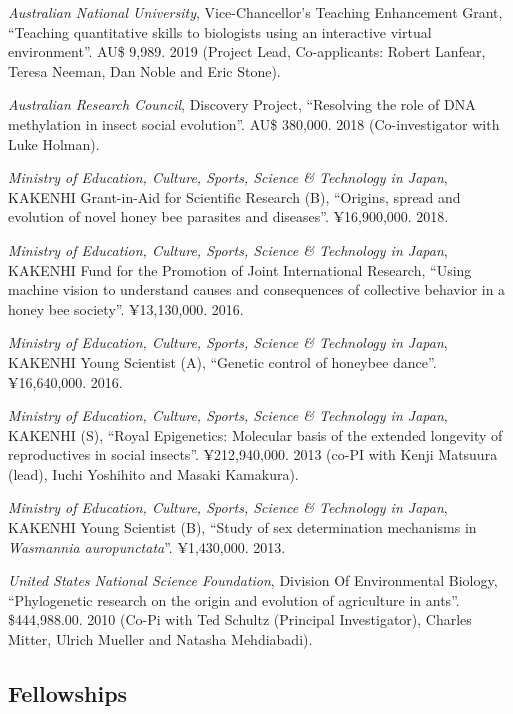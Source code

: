 \documentclass[11pt]{article}
\begin{document}
\ind \textit{Australian National University}, Vice-Chancellor's Teaching
Enhancement Grant, ``Teaching quantitative skills to biologists using an
interactive virtual environment''.  AU\$ 9,989. 2019 (Project Lead,
Co-applicants: Robert Lanfear, Teresa Neeman, Dan Noble and Eric Stone).



\ind \textit{Australian Research Council}, Discovery
Project, ``Resolving the role of DNA methylation in insect social
evolution''.  AU\$ 380,000. 2018 (Co-investigator with Luke Holman).


\ind \textit{Ministry of Education, Culture, Sports, Science \&
Technology in Japan}, KAKENHI Grant-in-Aid for Scientific Research
(B), ``Origins, spread and evolution of novel honey bee parasites and
diseases''.  ¥16,900,000. 2018.


\ind \textit{Ministry of Education, Culture, Sports, Science \&
Technology in Japan}, KAKENHI Fund for the Promotion of Joint
International Research, ``Using machine vision to understand causes and
consequences of collective behavior in a honey bee
society''.  ¥13,130,000. 2016.


\ind \textit{Ministry of Education, Culture, Sports, Science \&
Technology in Japan}, KAKENHI Young Scientist (A), ``Genetic control of
honeybee dance''.  ¥16,640,000. 2016.


\ind \textit{Ministry of Education, Culture, Sports, Science \&
Technology in Japan}, KAKENHI (S), ``Royal Epigenetics: Molecular basis
of the extended longevity of reproductives in social
insects''.  ¥212,940,000. 2013 (co-PI with Kenji Matsuura (lead), Iuchi
Yoshihito and Masaki Kamakura).


\ind \textit{Ministry of Education, Culture, Sports, Science \&
Technology in Japan}, KAKENHI Young Scientist (B), ``Study of sex
determination mechanisms in
\textit{Wasmannia auropunctata}''.  ¥1,430,000. 2013.


\ind \textit{United States National Science Foundation}, Division Of
Environmental Biology, ``Phylogenetic research on the origin and
evolution of agriculture in ants''.  \$444,988.00. 2010 (Co-Pi with Ted
Schultz (Principal Investigator), Charles Mitter, Ulrich Mueller and
Natasha Mehdiabadi).






\subsection{Fellowships}
\end{document}
